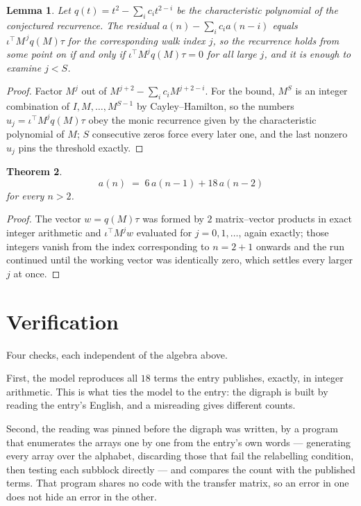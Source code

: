 \documentclass[11pt,a4paper]{article}
\theoremstyle{plain}
\newtheorem{theorem}{Theorem}
\newtheorem{lemma}[theorem]{Lemma}
\theoremstyle{definition}
\begin{document}
\begin{lemma}\label{lem:crit}
Let $q(t)=t^{2}-\sum_i c_it^{2-i}$ be the characteristic polynomial of the
conjectured recurrence. The residual $a(n)-\sum_ic_ia(n-i)$ equals
$\iota^{\!\top}M^{\,j}q(M)\tau$ for the corresponding walk index $j$, so the recurrence
holds from some point on if and only if $\iota^{\!\top}M^{j}q(M)\tau=0$ for all large $j$,
and it is enough to examine $j<S$.
\end{lemma}

\begin{proof}
Factor $M^{j}$ out of $M^{j+2}-\sum_ic_iM^{j+2-i}$. For the bound, $M^{S}$
is an integer combination of $I,M,\dots,M^{S-1}$ by Cayley--Hamilton, so the numbers
$u_j=\iota^{\!\top}M^{j}q(M)\tau$ obey the monic recurrence given by the characteristic
polynomial of $M$; $S$ consecutive zeros force every later one, and the last nonzero $u_j$
pins the threshold exactly.
\end{proof}

\begin{theorem}
\[
a(n)\;=\;6\,a(n-1) + 18\,a(n-2)
\]
for every $n>2$.
\end{theorem}

\begin{proof}
The vector $w=q(M)\tau$ was formed by $2$ matrix--vector products in exact integer
arithmetic and $\iota^{\!\top}M^{j}w$ evaluated for $j=0,1,\dots$, again exactly; those
integers vanish from the index corresponding to $n=2+1$ onwards and the run continued
until the working vector was identically zero, which settles every larger $j$ at once.
\end{proof}

\section{Verification}

Four checks, each independent of the algebra above.

First, the model reproduces all $18$ terms the entry publishes, exactly, in integer
arithmetic. This is what ties the model to the entry: the digraph is built by reading the
entry's English, and a misreading gives different counts.

Second, the reading was pinned before the digraph was written, by a program that enumerates
the arrays one by one from the entry's own words --- generating every array over the
alphabet, discarding those that fail the relabelling condition, then testing each subblock
directly --- and compares the count with the published terms. That program shares no code
with the transfer matrix, so an error in one does not hide an error in the other.
\end{document}
